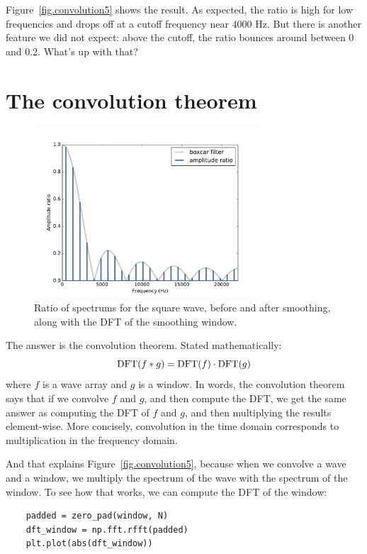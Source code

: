\documentclass[12pt]{book}
\begin{document}
Figure~\ref{fig.convolution5} shows the result.  As expected, the
ratio is high for low frequencies and drops off at a cutoff frequency
near 4000 Hz.  But there is another feature we did not expect: above
the cutoff, the ratio bounces around between 0 and 0.2.
What's up with that?


\section{The convolution theorem}
\label{convtheorem}

\begin{figure}
\centerline{\includegraphics[height=2.5in]{figs/convolution6.pdf}}
\caption{Ratio of spectrums for the square wave, before and after
  smoothing, along with the DFT of the smoothing window.}
\label{fig.convolution6}
\end{figure}

\newcommand{\DFT}{\mathrm{DFT}}
\newcommand{\IDFT}{\mathrm{IDFT}}

The answer is the convolution theorem.  Stated mathematically:
%
\[ \DFT(f \conv g) = \DFT(f) \cdot \DFT(g) \]
%
where $f$ is a wave array and $g$ is a window.  In words,
the convolution theorem says that if we convolve $f$ and $g$,
and then compute the DFT, we get the same answer as computing
the DFT of $f$ and $g$, and then multiplying the results
element-wise.  More concisely, convolution in the time
domain corresponds to multiplication in the frequency domain.

And that explains Figure~\ref{fig.convolution5}, because when we
convolve a wave and a window, we multiply the spectrum of
the wave with the spectrum of the window.  To see how that works,
we can compute the DFT of the window:

\begin{verbatim}
    padded = zero_pad(window, N)
    dft_window = np.fft.rfft(padded)
    plt.plot(abs(dft_window))
\end{verbatim}
\end{document}
